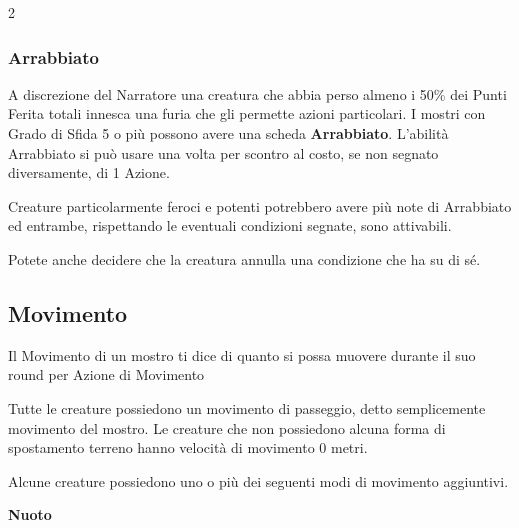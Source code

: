 \begin{multicols}{2}
\subsubsection{Arrabbiato}\label{mostroarrabbiato}

A discrezione del Narratore una creatura che abbia perso almeno i 50\% dei Punti Ferita totali innesca una furia che gli permette azioni particolari.
I mostri con Grado di Sfida 5 o più possono avere una scheda \textbf{Arrabbiato}. L'abilità Arrabbiato si può usare una volta per scontro al costo, se non segnato diversamente, di 1 Azione.

Creature particolarmente feroci e potenti potrebbero avere più note di Arrabbiato ed entrambe, rispettando le eventuali condizioni segnate, sono attivabili.


\medskip

Potete anche decidere che la creatura annulla una condizione che ha su di sé.

\subsection{Movimento}

Il Movimento di un mostro ti dice di quanto si possa muovere durante il suo round per Azione di Movimento

Tutte le creature possiedono un movimento di passeggio, detto semplicemente movimento del mostro. Le creature che non possiedono alcuna forma di spostamento terreno hanno velocità di movimento 0 metri.

Alcune creature possiedono uno o più dei seguenti modi di movimento aggiuntivi.


\smallskip\textbf{Nuoto}


\end{multicols}
